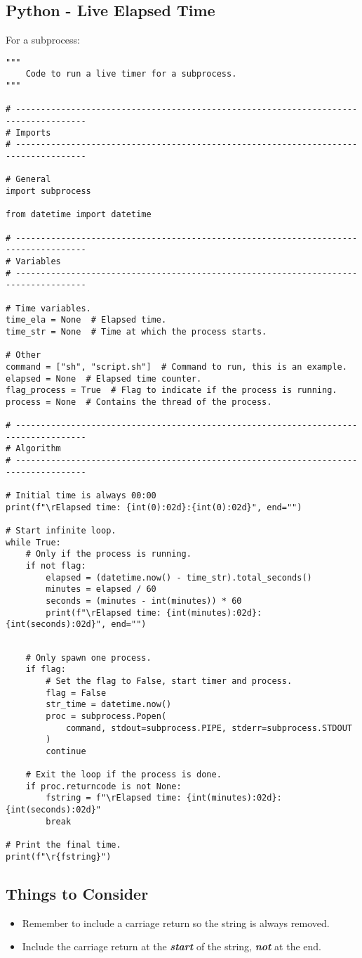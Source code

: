 \newpage
\subsection{Python - Live Elapsed Time}

For a subprocess:
\begin{verbatim}
"""
    Code to run a live timer for a subprocess.
"""

# ------------------------------------------------------------------------------------
# Imports
# ------------------------------------------------------------------------------------

# General
import subprocess

from datetime import datetime

# ------------------------------------------------------------------------------------
# Variables
# ------------------------------------------------------------------------------------

# Time variables.
time_ela = None  # Elapsed time.
time_str = None  # Time at which the process starts.

# Other
command = ["sh", "script.sh"]  # Command to run, this is an example.
elapsed = None  # Elapsed time counter.
flag_process = True  # Flag to indicate if the process is running.
process = None  # Contains the thread of the process.

# ------------------------------------------------------------------------------------
# Algorithm
# ------------------------------------------------------------------------------------

# Initial time is always 00:00
print(f"\rElapsed time: {int(0):02d}:{int(0):02d}", end="")

# Start infinite loop.
while True:
    # Only if the process is running.
    if not flag:
        elapsed = (datetime.now() - time_str).total_seconds()
        minutes = elapsed / 60
        seconds = (minutes - int(minutes)) * 60
        print(f"\rElapsed time: {int(minutes):02d}:{int(seconds):02d}", end="")

\end{verbatim}
\newpage
\begin{verbatim}

    # Only spawn one process.
    if flag:
        # Set the flag to False, start timer and process.
        flag = False
        str_time = datetime.now()
        proc = subprocess.Popen(
            command, stdout=subprocess.PIPE, stderr=subprocess.STDOUT
        )
        continue
    
    # Exit the loop if the process is done.
    if proc.returncode is not None:
        fstring = f"\rElapsed time: {int(minutes):02d}:{int(seconds):02d}"
        break

# Print the final time.
print(f"\r{fstring}")

\end{verbatim}
\subsection*{Things to Consider}
\begin{itemize}
    \item Remember to include a carriage return so the string is always removed.
    \item Include the carriage return at the \textbf{\textit{start}} of the string,
          \textbf{\textit{not}} at the end.
\end{itemize}
